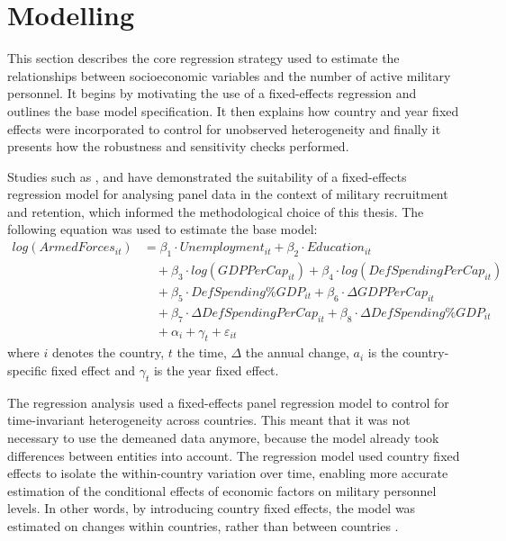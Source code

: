 \section{Modelling}

This section describes the core regression strategy used to estimate the relationships between socioeconomic variables and the number of active military personnel.
It begins by motivating the use of a fixed-effects regression and outlines the base model specification.
It then explains how country and year fixed effects were incorporated to control for unobserved heterogeneity and finally it presents how the robustness and sensitivity checks performed.

Studies such as \textcite{asch_cash_2010}, \textcite{backstrom_are_2019} and \textcite{balcaen_unemployment_2025} have demonstrated the suitability of a fixed-effects regression model for analysing panel data in the context of military recruitment and retention, which informed the methodological choice of this thesis.
The following equation was used to estimate the base model:
\begin{align*}
log(ArmedForces_{it}) &= \beta_1 \cdot Unemployment_{it} 
+ \beta_2 \cdot Education_{it} \\
&\quad + \beta_3 \cdot log(GDPPerCap_{it}) 
+ \beta_4 \cdot log(DefSpendingPerCap_{it}) \\
&\quad + \beta_5 \cdot DefSpending\%GDP_{it} 
+ \beta_6 \cdot \Delta GDPPerCap_{it} \\
&\quad + \beta_7 \cdot \Delta DefSpendingPerCap_{it} 
+ \beta_8 \cdot \Delta DefSpending\%GDP_{it} \\
&\quad + \alpha_i + \gamma_t + \varepsilon_{it}
\end{align*}
where $i$ denotes the country, $t$ the time, $\Delta$ the annual change, $a_i$ is the country-specific fixed effect and $\gamma_t$ is the year fixed effect.

The regression analysis used a fixed-effects panel regression model to control for time-invariant heterogeneity across countries. 
This meant that it was not necessary to use the demeaned data anymore, because the model already took differences between entities into account.
The regression model used country fixed effects to isolate the within-country variation over time, enabling more accurate estimation of the conditional effects of economic factors on military personnel levels.
In other words, by introducing country fixed effects, the model was estimated on changes within countries, rather than between countries \parencite{backstrom_are_2019}.

